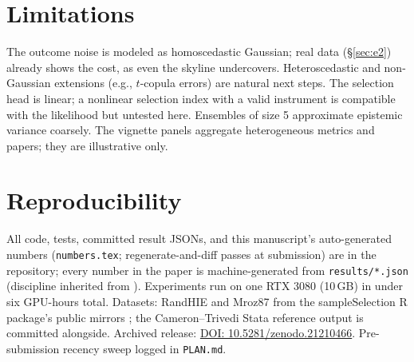 \documentclass[10pt]{article}
\begin{document}
\section{Limitations}

The outcome noise is modeled as homoscedastic Gaussian; real data
(\S\ref{sec:e2}) already shows the cost, as even the skyline undercovers.
Heteroscedastic and non-Gaussian extensions (e.g., $t$-copula errors) are
natural next steps. The selection head is linear; a nonlinear selection
index with a valid instrument is compatible with the likelihood but
untested here. Ensembles of size 5 approximate epistemic variance
coarsely. The vignette panels aggregate heterogeneous metrics and papers;
they are illustrative only.

\section{Reproducibility}
\label{sec:repro}

All code, tests, committed result JSONs, and this manuscript's
auto-generated numbers (\texttt{numbers.tex}; regenerate-and-diff passes
at submission) are in the repository; every number in the paper is
machine-generated from \texttt{results/*.json} (discipline inherited from
\citealp{howe2026eventrice}). Experiments run on one RTX 3080 (10\,GB) in
under six GPU-hours total. Datasets: RandHIE and Mroz87 from the
sampleSelection R package's public mirrors \citep{toomet2008}; the
Cameron--Trivedi Stata reference output is committed alongside. Archived
release: \href{https://doi.org/10.5281/zenodo.21210466}{DOI:
10.5281/zenodo.21210466}. Pre-submission recency sweep logged in
\texttt{PLAN.md}.



\end{document}
